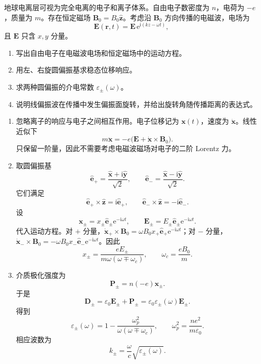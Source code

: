 \begin{question}
地球电离层可视为完全电离的电子和离子体系。自由电子数密度为 $n$，电荷为 $-e$，质量为 $m$。存在恒定磁场 $\mathbf B_0=B_0\hat{\mathbf z}$。考虑沿 $\mathbf B_0$ 方向传播的电磁波，电场为
\[
  \mathbf E(\mathbf r,t)=\mathbf E\,\mathrm e^{\mathrm i(kz-\omega t)},
\]
且 $\mathbf E$ 只含 $x,y$ 分量。
\begin{enumerate}
  \item 写出自由电子在电磁波电场和恒定磁场中的运动方程。
  \item 用左、右旋圆偏振基求稳态位移响应。
  \item 求两种圆偏振的介电常数 $\varepsilon_\pm(\omega)$。
  \item 说明线偏振波在传播中发生偏振面旋转，并给出旋转角随传播距离的表达式。
\end{enumerate}
\begin{solution}
\begin{enumerate}
  \item 忽略离子的响应与电子之间相互作用。电子位移记为 $\mathbf x(t)$，速度为 $\dot{\mathbf x}$。线性近似下
  \[
    m\ddot{\mathbf x}=-e\bigl(\mathbf E+\dot{\mathbf x}\times\mathbf B_0\bigr) .
  \]
  只保留一阶量，因此不需要考虑电磁波磁场对电子的二阶 Lorentz 力。

  \item 取圆偏振基
  \[
    \hat{\mathbf e}_+=\frac{\hat{\mathbf x}+\mathrm i\hat{\mathbf y}}{\sqrt2},
    \qquad
    \hat{\mathbf e}_-=\frac{\hat{\mathbf x}-\mathrm i\hat{\mathbf y}}{\sqrt2} .
  \]
  它们满足
  \[
    \hat{\mathbf e}_+\times\hat{\mathbf z}=\mathrm i\hat{\mathbf e}_+,
    \qquad
    \hat{\mathbf e}_-\times\hat{\mathbf z}=-\mathrm i\hat{\mathbf e}_- .
  \]
  设
  \[
    \mathbf x_\pm=x_\pm\hat{\mathbf e}_\pm\mathrm e^{-\mathrm i\omega t},
    \qquad
    \mathbf E_\pm=E_\pm\hat{\mathbf e}_\pm\mathrm e^{-\mathrm i\omega t} .
  \]
  代入运动方程。对 $+$ 分量，$\dot{\mathbf x}_+\times\mathbf B_0=\omega B_0x_+\hat{\mathbf e}_+\mathrm e^{-\mathrm i\omega t}$；对 $-$ 分量，$\dot{\mathbf x}_-\times\mathbf B_0=-\omega B_0x_-\hat{\mathbf e}_-\mathrm e^{-\mathrm i\omega t}$。因此
  \[
    x_\pm=\frac{eE_\pm}{m\omega(\omega\mp\omega_c)},
    \qquad
    \omega_c=\frac{eB_0}{m} .
  \]

  \item 介质极化强度为
  \[
    \mathbf P_\pm=n(-e)\mathbf x_\pm .
  \]
  于是
  \[
    \mathbf D_\pm=\varepsilon_0\mathbf E_\pm+\mathbf P_\pm
    =\varepsilon_0\varepsilon_\pm(\omega)\mathbf E_\pm .
  \]
  得到
  \[
    \boxed{\varepsilon_\pm(\omega)
    =1-\frac{\omega_p^2}{\omega(\omega\mp\omega_c)}} ,
    \qquad
    \omega_p^2=\frac{ne^2}{m\varepsilon_0} .
  \]
  相应波数为
  \[
    k_\pm=\frac{\omega}{c}\sqrt{\varepsilon_\pm(\omega)} .
  \]


\end{enumerate}
\end{solution}
\end{question}
